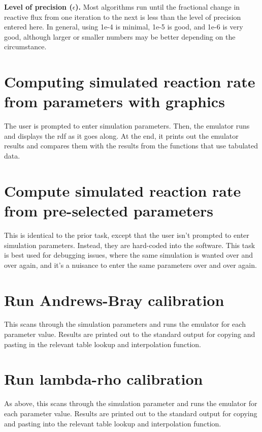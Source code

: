 \documentclass {book}
\begin{document}
\textbf{Level of precision ($\epsilon$).} Most algorithms run until the fractional change in reactive flux from one iteration to the next is less than the level of precision entered here. In general, using 1e-4 is minimal, 1e-5 is good, and 1e-6 is very good, although larger or smaller numbers may be better depending on the circumstance.

\section{Computing simulated reaction rate from parameters with graphics}

The user is prompted to enter simulation parameters. Then, the emulator runs and displays the rdf as it goes along. At the end, it prints out the emulator results and compares them with the results from the functions that use tabulated data.

\section{Compute simulated reaction rate from pre-selected parameters}

This is identical to the prior task, except that the user isn't prompted to enter simulation parameters. Instead, they are hard-coded into the software. This task is best used for debugging issues, where the same simulation is wanted over and over again, and it's a nuisance to enter the same parameters over and over again.

\section{Run Andrews-Bray calibration}

This scans through the simulation parameters and runs the emulator for each parameter value. Results are printed out to the standard output for copying and pasting in the relevant table lookup and interpolation function.

\section{Run lambda-rho calibration}

As above, this scans through the simulation parameter and runs the emulator for each parameter value. Results are printed out to the standard output for copying and pasting into the relevant table lookup and interpolation function.
\end{document}
